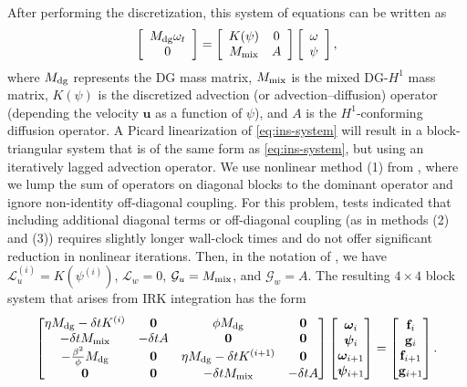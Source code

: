 \documentclass[review]{siamart}
\begin{document}
After performing the discretization, this system of equations can be written as
\begin{equation}
	\label{eq:ins-system}
	\left[ \begin{array}{c} M_{\rm dg} \omega_t \\ 0 \end{array} \right]
	=
	\left[ \begin{array}{cc} K(\psi) & 0 \\ M_{\rm mix} & A \end{array} \right]
	\left[ \begin{array}{c} \omega \\ \psi \end{array} \right],
\end{equation}
where $M_{\rm dg}$ represents the DG mass matrix, $M_{\rm mix}$ is the mixed
DG-$H^1$ mass matrix, $K(\psi)$ is the discretized advection (or
advection--diffusion) operator (depending the velocity $\bm u$ as a function of
$\psi$), and $A$ is the $H^1$-conforming diffusion operator. A Picard
linearization of \eqref{eq:ins-system} will result in a block-triangular system
that is of the same form as \eqref{eq:ins-system}, but using an iteratively
lagged advection operator. We use nonlinear method (1) from
, where we lump the sum of operators on diagonal
blocks to the dominant operator and ignore non-identity off-diagonal coupling.
For this problem, tests indicated that including additional diagonal terms or
off-diagonal coupling (as in methods (2) and (3)) requires slightly
longer wall-clock times and do not offer significant reduction in nonlinear
iterations. Then, in the notation of , we have $\mathcal{L}_u^{(i)} =
K(\psi^{(i)})$, $\mathcal{L}_w = 0$, $\mathcal{G}_u = M_{\rm mix}$, and
$\mathcal{G}_w = A$. The resulting $4\times4$ block system that arises from IRK
integration has the form
\begin{align} \label{eq:vsf-system-1}
	\begin{bmatrix}
		\eta M_{\rm dg} - \delta t K^{(i)} & \mathbf{0} & \phi M_{\rm dg} & \mathbf{0} \\
		-\delta t M_{\rm mix} & -\delta t A & \mathbf{0} & \mathbf{0} \\
		-\tfrac{\beta^2}{\phi}M_{\rm dg} & \mathbf{0} & \eta M_{\rm dg} - \delta t K^{(i+1)} & \mathbf{0} \\
		\mathbf{0} & \mathbf{0} & -\delta t M_{\rm mix} & -\delta t A
	\end{bmatrix}
	\begin{bmatrix} \bm\omega_i \\ \bm\psi_i \\ \bm\omega_{i+1} \\ \bm\psi_{i+1} \end{bmatrix}
	=
	\begin{bmatrix} \mathbf{f}_i \\ \mathbf{g}_i \\ \mathbf{f}_{i+1} \\ \mathbf{g}_{i+1} \end{bmatrix}.
\end{align}
\end{document}

